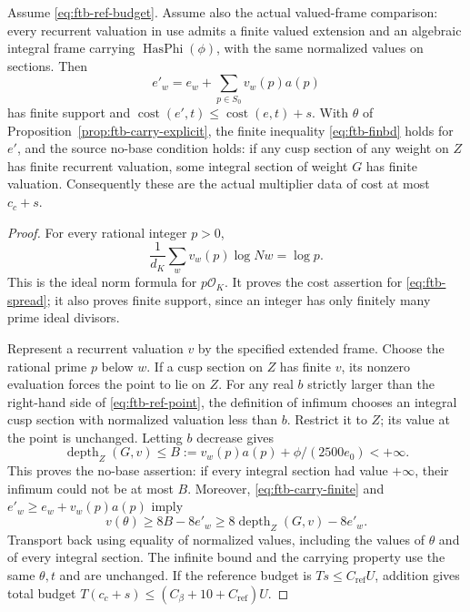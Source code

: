 \begin{srproposition}
\label{prop:ftb-carry-spread}
Assume \eqref{eq:ftb-ref-budget}.  Assume also the actual valued-frame
comparison: every recurrent valuation in use admits a finite valued
extension and an algebraic integral frame carrying
\(\operatorname{HasPhi}(\phi)\), with the same normalized values
on sections.  Then
\[
                  e'_w=e_w+\sum_{p\in S_0}v_w(p)a(p)
 \tag{C15}\label{eq:ftb-spread}
\]
has finite support and
\(\operatorname{cost}(e',t)\leq\operatorname{cost}(e,t)+s\).
With \(\theta\) of Proposition~\ref{prop:ftb-carry-explicit},
the finite inequality \eqref{eq:ftb-finbd} holds for \(e'\), and
the source no-base condition holds: if any cusp section of any weight
on \(Z\) has finite recurrent valuation, some integral section of
weight \(G\) has finite valuation.  Consequently these are the
actual multiplier data of cost at most \(c_c+s\).
\end{srproposition}
\begin{proof}
For every rational integer \(p>0\),
\[
 \frac1{d_K}\sum_w v_w(p)\log Nw=\log p .
\]
This is the ideal norm formula for \(p\mathcal O_K\).
It proves the cost assertion for \eqref{eq:ftb-spread}; it also
proves finite support, since an integer has only finitely many
prime ideal divisors.

Represent a recurrent valuation \(v\) by the specified extended frame.
Choose the rational prime \(p\) below \(w\).
If a cusp section on \(Z\) has finite \(v\), its nonzero evaluation
forces the point to lie on \(Z\).
For any real \(b\) strictly larger than the right-hand side of
\eqref{eq:ftb-ref-point}, the definition of infimum chooses an
integral cusp section with normalized valuation less than \(b\).
Restrict it to \(Z\); its value at the point is unchanged.
Letting \(b\) decrease gives
\[
 \operatorname{depth}_Z(G,v)\leq
 B:=v_w(p)a(p)+\phi/(2500e_0)<+\infty .
\]
This proves the no-base assertion: if every integral section had
value \(+\infty\), their infimum could not be at most \(B\).
Moreover, \eqref{eq:ftb-carry-finite} and
\(e'_w\geq e_w+v_w(p)a(p)\) imply
\[
 v(\theta)\geq8B-8e'_w
       \geq8\operatorname{depth}_Z(G,v)-8e'_w.
\]
Transport back using equality of normalized values, including
the values of \(\theta\) and of every integral section.
The infinite bound and the carrying property use the same
\(\theta,t\) and are unchanged.  If the reference budget is
\(Ts\leq C_{\mathrm{ref}}U\), addition gives total budget
\(T(c_c+s)\leq(C_\beta+10+C_{\mathrm{ref}})U\).
\end{proof}

